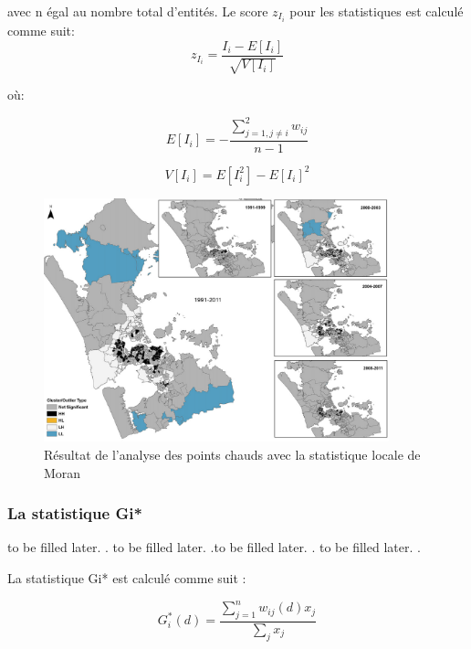 \medskip
avec n égal au nombre total d'entités.
Le score $z_{I_{i}}$ pour les statistiques est calculé comme suit:
\medskip
\begin{equation}
    z_{I_{i}} = \frac{I_i - E [I_i]}{\sqrt{V[I_i]}}
\end{equation}

où:
\medskip

\begin{equation}
    E[I_i] = -\frac{\sum_{j=1,j\neq i}^2 w_{ij} }{n-1}
\end{equation}

\begin{equation}
    V[I_i] = E[I_i^2] - E[I_i]^2
\end{equation}

\medskip

\begin{figure}[hbt!]
  \centering
  \includegraphics[width=10cm]{images_pfe/LSA_result.png}
  \caption{Résultat de l'analyse des points chauds avec la statistique locale de Moran \parencite{aguilar_distribution_2013}}
  \label{fig:lsa-result}
\end{figure}
\FloatBarrier

\medskip

\subsubsection{La statistique Gi*}
\label{subsec-gi-star}to be filled later. \parencite{getis_analysis_1992}. to be filled later. \parencite{kalinic_kernel_2018}.to be filled later. \parencite{getis_analysis_1992}. to be filled later. \parencite{kalinic_kernel_2018}.
\medskip

La statistique Gi* est calculé comme suit \parencite{getis_analysis_1992}:

\medskip

\begin{equation}
    G_i^*(d) = \frac{\sum_{j=1}^n w_{ij}(d)x_j}{\sum_j x_j}
\end{equation}

